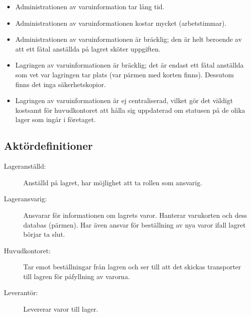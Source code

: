 \documentclass[a4paper,12pt]{article}
\begin{document}
\begin{itemize}
\item Administrationen av varuinformation tar lång tid.
\item Administrationen av varuinformationen kostar mycket (arbetstimmar).
\item Administrationen av varuinformationen är bräcklig; den är helt beroende av att ett fåtal anställda på lagret sköter uppgiften.
\item Lagringen av varuinformationen är bräcklig; det är endast ett fåtal anställda som vet var lagringen tar plats (var pärmen med korten finns). Dessutom finns det inga säkerhetskopior.
\item Lagringen av varuinformationen är ej centraliserad, vilket gör det väldigt kostsamt för huvudkontoret att hålla sig uppdaterad om statusen på de olika lager som ingår i företaget.
\end{itemize}

\subsection{\textsf{Aktördefinitioner}}
\begin{description}
\item[Lageranställd:] Anställd på lagret, har möjlighet att ta rollen som ansvarig.
\item[Lageransvarig:] Ansvarar för informationen om lagrets varor. Hanterar varukorten och dess databas (pärmen). Har även ansvar för beställning av nya varor ifall lagret börjar ta slut.
\item[Huvudkontoret:] Tar emot beställningar från lagren och ser till att det skickas transporter till lagren för påfyllning av varorna.
\item[Leverantör:] Levererar varor till lager.
\end{description}
\end{document}
